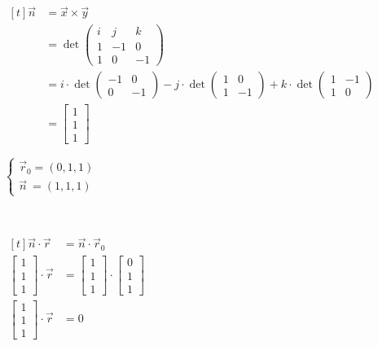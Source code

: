 \documentclass[11pt,fleqn]{book} %
\begin{document}
\begin{enumerate}
    $\begin{aligned}[t]
        \vec{n}
        & = \vec{x} \times \vec{y}\\
        & = \det \begin{pmatrix} i & j & k \\ 1 & -1 & 0 \\ 1 & 0 & -1 \end{pmatrix} \\
        & = i \cdot \det \begin{pmatrix} -1 & 0 \\ 0 & -1 \end{pmatrix} - j \cdot \det \begin{pmatrix} 1 & 0 \\ 1 & -1 \end{pmatrix} + k \cdot \det \begin{pmatrix} 1 & -1 \\ 1 & 0 \end{pmatrix} \\
        & = \begin{bmatrix} 1 \\ 1 \\ 1 \end{bmatrix}
    \end{aligned}$

    $\begin{cases}
        \vec{r}_0 = (0, 1, 1) \\
        \vec{n} ~= (1, 1, 1)
    \end{cases}$

    {~~~}

    $\begin{aligned}[t]
        \vec{n} \cdot \vec{r}
        & = \vec{n} \cdot \vec{r}_0                                                                   \\
        \begin{bmatrix} 1 \\ 1 \\ 1 \end{bmatrix} \cdot \vec{r}
        & = \begin{bmatrix} 1 \\ 1 \\ 1 \end{bmatrix} \cdot \begin{bmatrix} 0 \\ 1 \\ 1 \end{bmatrix} \\
        \begin{bmatrix} 1 \\ 1 \\ 1 \end{bmatrix} \cdot \vec{r}
        & = 0
    \end{aligned}$


\end{enumerate}
\end{document}
